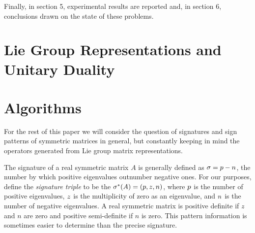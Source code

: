 \documentclass{acm_proc_article-sp}
\begin{document}
Finally, in section 5, experimental results are reported
and, in section 6, conclusions drawn on the state of these problems.

\section{Lie Group Representations and Unitary Duality}


\section{Algorithms} %

For the rest of this paper we will consider the question of signatures and
sign patterns
of symmetric matrices in general, but constantly keeping in mind the 
operators generated from Lie group matrix representations.

The signature of a real symmetric matrix $A$ is 
generally defined as $\sigma = p - n$, the number by which positive eigenvalues 
outnumber negative ones.  
For our purposes, define the {\em signature triple} to be the 
$\sigma^{*}(A) = (p, z, n)$, 
where $p$ is the number of positive eigenvalues, $z$ is the 
multiplicity of zero as an eigenvalue, and $n$ is the number of negative eigenvalues.
A real symmetric matrix is 
positive definite if $z$ and $n$ are zero and 
positive semi-definite if $n$ is zero.
This pattern information is sometimes easier to determine than the precise signature.
\end{document}
